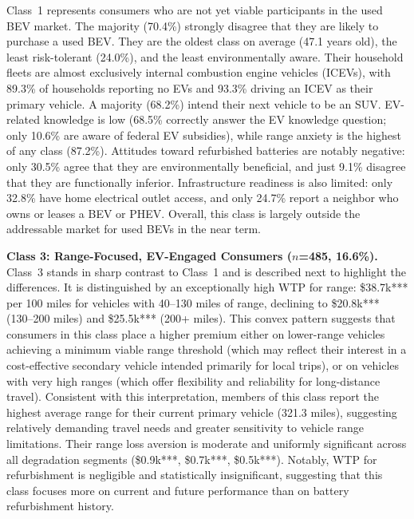 \documentclass[a4paper,fleqn]{cas-sc}   %
\begin{document}
Class~1 represents consumers who are not yet viable participants in the used BEV market. The majority (70.4\%) strongly disagree that they are likely to purchase a used BEV. They are the oldest class on average (47.1 years old), the least risk-tolerant (24.0\%), and the least environmentally aware. Their household fleets are almost exclusively internal combustion engine vehicles (ICEVs), with 89.3\% of households reporting no EVs and 93.3\% driving an ICEV as their primary vehicle. A majority (68.2\%) intend their next vehicle to be an SUV. EV-related knowledge is low (68.5\% correctly answer the EV knowledge question; only 10.6\% are aware of federal EV subsidies), while range anxiety is the highest of any class (87.2\%). Attitudes toward refurbished batteries are notably negative: only 30.5\% agree that they are environmentally beneficial, and just 9.1\% disagree that they are functionally inferior. Infrastructure readiness is also limited: only 32.8\% have home electrical outlet access, and only 24.7\% report a neighbor who owns or leases a BEV or PHEV. Overall, this class is largely outside the addressable market for used BEVs in the near term.

\medskip

\noindent\textbf{Class 3: Range-Focused, EV-Engaged Consumers ($n$=485, 16.6\%).}\\
Class~3 stands in sharp contrast to Class~1 and is described next to highlight the differences. It is distinguished by an exceptionally high WTP for range: \$38.7k*** per 100 miles for vehicles with 40--130 miles of range, declining to \$20.8k*** (130--200 miles) and \$25.5k*** (200+ miles). This convex pattern suggests that consumers in this class place a higher premium either on lower-range vehicles achieving a minimum viable range threshold (which may reflect their interest in a cost-effective secondary vehicle intended primarily for local trips), or on vehicles with very high ranges (which offer flexibility and reliability for long-distance travel). Consistent with this interpretation, members of this class report the highest average range for their current primary vehicle (321.3 miles), suggesting relatively demanding travel needs and greater sensitivity to vehicle range limitations. Their range loss aversion is moderate and uniformly significant across all degradation segments (\$0.9k***, \$0.7k***, \$0.5k***). Notably, WTP for refurbishment is negligible and statistically insignificant, suggesting that this class focuses more on current and future performance than on battery refurbishment history.
\end{document}
